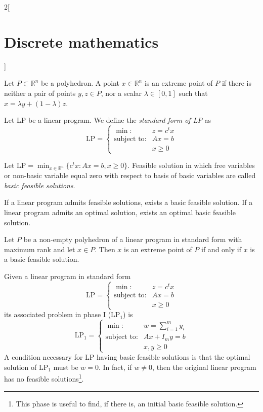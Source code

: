 \documentclass[../../../main.tex]{subfiles}
\begin{document}
\begin{multicols}{2}[\section{Discrete mathematics}]
\begin{definition}
\end{definition}
\begin{definition}
Let $P\subset\mathbb{R}^n$ be a polyhedron. A point $x\in\mathbb{R}^n$ is an extreme point of $P$ if there is neither a pair of points $y,z\in P$, nor a scalar $\lambda\in[0,1]$ such that $x=\lambda y+(1-\lambda)z$.
\end{definition}
\begin{definition}
Let LP be a linear program. We define the \textit{standard form of LP} as $$\text{LP}=\left\{\begin{array}{rc}
    \min: & z=c^tx \\
    \text{subject to}: & Ax=b\\
     & x\geq 0
    \end{array}\right.$$
\end{definition}
\begin{definition}
Let $\displaystyle \text{LP}=\min_{x\in\mathbb{R}^n}\{c^tx:Ax=b,x\geq 0\}$. Feasible solution in which free variables or non-basic variable equal zero with respect to basis of basic variables are called \textit{basic feasible solutions}.
\end{definition}
\begin{prop}
If a linear program admits feasible solutions, exists a basic feasible solution. If a linear program admits an optimal solution, exists an optimal basic feasible solution.
\end{prop}
\begin{theorem}
Let $P$ be a non-empty polyhedron of a linear program in standard form with maximum rank and let $x\in P$. Then $x$ is an extreme point of $P$ if and only if $x$ is a basic feasible solution.
\end{theorem}
\begin{definition}
Given a linear program in standard form $$\text{LP}=\left\{\begin{array}{rc}
    \min: & z=c^tx \\
    \text{subject to}: & Ax=b\\
     & x\geq 0
    \end{array}\right.$$ its associated problem in phase I ($\text{LP}_1$) is $$\text{LP}_1=\left\{\begin{array}{rc}
    \min: & \displaystyle w=\sum_{i=1}^my_i \\
    \text{subject to}: & Ax+I_my=b\\
     & x,y\geq 0
    \end{array}\right.$$
    A condition necessary for LP having basic feasible solutions is that the optimal solution of $\text{LP}_1$ must be $w=0$. In fact, if $w\ne 0$, then the original linear program has no feasible solutions\footnote{This phase is useful to find, if there is, an initial basic feasible solution.}.

\end{definition}
\end{multicols}
\end{document}
